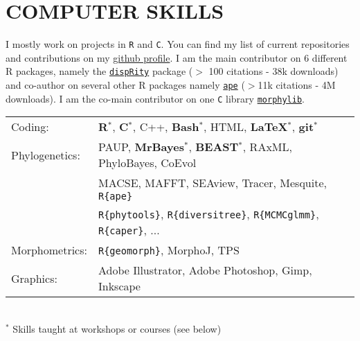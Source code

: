 \documentclass[10pt,a4paper]{article}
\begin{document}
{%
\section{COMPUTER SKILLS}

I mostly work on projects in \texttt{R} and \texttt{C}. You can find my list of current repositories and contributions on my \href{https://github.com/tguillerme}{github profile}. I am the main contributor on 6 different R packages, namely the \href{https://github.com/tguillerme/dispRity}{\texttt{dispRity}} package ($>$ 100 citations - 38k downloads) and co-author on several other R packages namely \href{https://github.com/emmanuelparadis/ape}{\texttt{ape}} ($>$11k citations - 4M downloads). I am the co-main contributor on one \texttt{C} library \href{https://github.com/mbrazeau/morphylib}{\texttt{morphylib}}.

\bigskip

\begin{tabular}{ll}
Coding: & \textbf{{R}$^{*}$}, \textbf{C$^{*}$}, C++, \textbf{Bash$^{*}$}, HTML, \textbf{\LaTeX$^{*}$}, \textbf{git$^{*}$}\\[1.5ex]
Phylogenetics: & PAUP, \textbf{MrBayes$^{*}$}, \textbf{BEAST$^{*}$}, RAxML, PhyloBayes, CoEvol \\
& MACSE, MAFFT, SEAview, Tracer, Mesquite, \texttt{R\{ape\}} \\
& \texttt{R\{phytools\}}, \texttt{R\{diversitree\}}, \texttt{R\{MCMCglmm\}}, \texttt{R\{caper\}}, ... \\[1.5ex]
Morphometrics: & \texttt{R\{geomorph\}}, MorphoJ, TPS \\[1.5ex]
Graphics: & Adobe Illustrator, Adobe Photoshop, Gimp, Inkscape\\[1.5ex]
\end{tabular} \\
$^{*}$ Skills taught at workshops or courses (see below)
\bigskip

}
\end{document}
